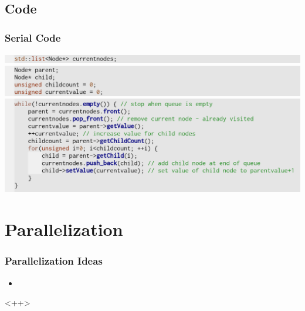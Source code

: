 \subsection{Code}
\begin{frame}
	\frametitle{Serial Code}
	\begin{center}
		\includegraphics[width=\textwidth]{img/code1} \\
		\includegraphics[width=\textwidth]{img/code2} \\
		\includegraphics[width=\textwidth]{img/code3}
	\end{center}
\end{frame}


\section{Parallelization}
\begin{frame}

\frametitle{Parallelization Ideas}
\begin{itemize}
	\item 
\end{itemize}<++>
\end{frame}


